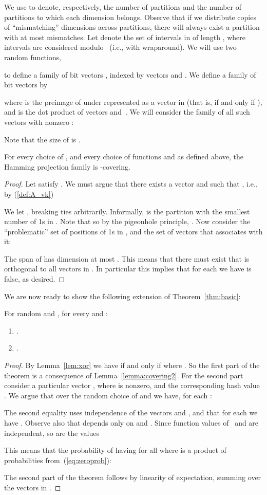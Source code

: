 \documentclass[prodmode,acmtalg]{acmsmall}
\begin{document}
We use  to denote, respectively, the number of partitions and the number of partitions to which each dimension belongs.
Observe that if we distribute  copies of  ``mismatching'' dimensions across  partitions, there will always exist a partition with at most  mismatches.
Let  denote the set of intervals in  of length , where intervals are considered modulo~ (i.e., with wraparound).
We will use two random functions,


to define a family of bit vectors , indexed by vectors  and . 
We define a family of bit vectors  by

where  is the preimage of  under  represented as a vector in  (that is,  if and only if ), and  is the dot product of vectors  and~.
We will consider the family of all such vectors with nonzero :

Note that the size of  is .


\begin{lemma}\label{lemma:covering2}
For every choice of , and every choice of functions  and  as defined above, the Hamming projection family  is -covering.
\end{lemma}
\begin{proof}
Let  satisfy . 
We must argue that there exists a vector  and  such that , i.e., by (\ref{def:A_vk})

We let , breaking ties arbitrarily.
Informally,  is the partition with the smallest number of 1s in .
Note that  so by the pigeonhole principle, .
Now consider the ``problematic'' set  of positions of 1s in , and the set of vectors that  associates with it:

The span of  has dimension at most .
This means that there must exist  that is orthogonal to all vectors in .
In particular this implies that for each  we have  is false, as desired. 
\end{proof}

We are now ready to show the following extension of Theorem~\ref{thm:basic}:
\begin{theorem}\label{thm:main}
	For random  and , for every  and :
	\begin{enumerate}
\item .
\item .
\end{enumerate}
\end{theorem}
\begin{proof}
    By Lemma~\ref{lem:xor} we have  if and only if  where .
	So the first part of the theorem is a consequence of Lemma~\ref{lemma:covering2}.
	For the second part consider a particular vector , where  is nonzero, and the corresponding hash value .
	We argue that over the random choice of  and  we have, for each :

The second equality uses independence of the vectors  and , and that for each  we have .
	Observe also that  depends only on  and .
	Since function values of~ and  are independent, so are the values 

This means that the probability of having  for all  where  is a product of probabilities from~(\ref{eq:zeroprob}):

The second part of the theorem follows by linearity of expectation, summing over the 
vectors in . 
\end{proof}
\end{document}
